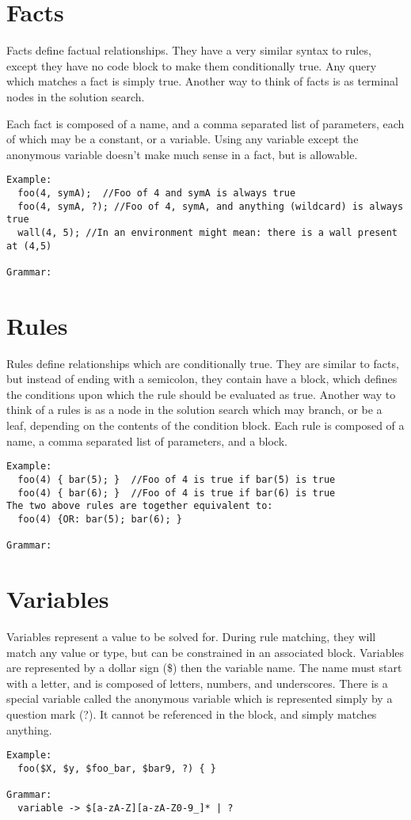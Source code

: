 \documentclass[onecolumn,titlepage]{article}
\begin{document}
\section{Facts}
Facts define factual relationships.  They have a very similar syntax to rules, except they
have no code block to make them conditionally true.  Any query which matches a fact is simply
true. Another way to think of facts is as terminal nodes in the solution search.

Each fact is composed of a name, and a comma separated list of parameters, each of which may
be a constant, or a variable.  Using any variable except the anonymous variable doesn't make
much sense in a fact, but is allowable.
\begin{verbatim}
Example:
  foo(4, symA);  //Foo of 4 and symA is always true
  foo(4, symA, ?); //Foo of 4, symA, and anything (wildcard) is always true
  wall(4, 5); //In an environment might mean: there is a wall present at (4,5)

Grammar:
\end{verbatim}

\section{Rules}
Rules define relationships which are conditionally true.  They are similar to facts, but
instead of ending with a semicolon, they contain have a block, which defines the conditions
upon which the rule should be evaluated as true.  Another way to think of a rules is as
a node in the solution search which may branch, or be a leaf, depending on the contents
of the condition block. Each rule is composed of a name, a comma separated list of parameters,
and a block.

\begin{verbatim}
Example:
  foo(4) { bar(5); }  //Foo of 4 is true if bar(5) is true
  foo(4) { bar(6); }  //Foo of 4 is true if bar(6) is true
The two above rules are together equivalent to:
  foo(4) {OR: bar(5); bar(6); }

Grammar:
\end{verbatim}

\section{Variables}
Variables represent a value to be solved for.  During rule matching, they will match any
value or type, but can be constrained in an associated block.
Variables are represented by a dollar sign (\$) then the variable name. The name must
start with a letter, and is composed of letters, numbers, and underscores.  There is a special
variable called the anonymous variable which is represented simply by a question mark (?).  It
cannot be referenced in the block, and simply matches anything.
\begin{verbatim}
Example:
  foo($X, $y, $foo_bar, $bar9, ?) { }

Grammar:
  variable -> $[a-zA-Z][a-zA-Z0-9_]* | ?
\end{verbatim}
\end{document}
